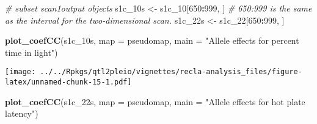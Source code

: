 \documentclass[oneside]{book}
\newenvironment{Shaded}{\begin{snugshade}}{\end{snugshade}}
\newcommand{\CommentTok}[1]{\textcolor[rgb]{0.56,0.35,0.01}{\textit{#1}}}
\newcommand{\DataTypeTok}[1]{\textcolor[rgb]{0.13,0.29,0.53}{#1}}
\newcommand{\DecValTok}[1]{\textcolor[rgb]{0.00,0.00,0.81}{#1}}
\newcommand{\KeywordTok}[1]{\textcolor[rgb]{0.13,0.29,0.53}{\textbf{#1}}}
\newcommand{\NormalTok}[1]{#1}
\newcommand{\OperatorTok}[1]{\textcolor[rgb]{0.81,0.36,0.00}{\textbf{#1}}}
\newcommand{\OtherTok}[1]{\textcolor[rgb]{0.56,0.35,0.01}{#1}}
\newcommand{\StringTok}[1]{\textcolor[rgb]{0.31,0.60,0.02}{#1}}
\begin{document}
\begin{Shaded}
\end{Shaded}

\begin{Shaded}
\begin{Highlighting}[]
\CommentTok{# subset scan1output objects}
\NormalTok{s1c_10s <-}\StringTok{ }\NormalTok{s1c_}\DecValTok{10}\NormalTok{[}\DecValTok{650}\OperatorTok{:}\DecValTok{999}\NormalTok{, ] }\CommentTok{# 650:999 is the same as the interval for the two-dimensional scan.}
\NormalTok{s1c_22s <-}\StringTok{ }\NormalTok{s1c_}\DecValTok{22}\NormalTok{[}\DecValTok{650}\OperatorTok{:}\DecValTok{999}\NormalTok{, ]}
\end{Highlighting}
\end{Shaded}

\begin{Shaded}
\begin{Highlighting}[]
\KeywordTok{plot_coefCC}\NormalTok{(s1c_10s, }\DataTypeTok{map =}\NormalTok{ pseudomap, }\DataTypeTok{main =} \StringTok{"Allele effects for percent time in light"}\NormalTok{)}
\end{Highlighting}
\end{Shaded}

\texttt{[image: ../../Rpkgs/qtl2pleio/vignettes/recla-analysis\_files/figure-latex/unnamed-chunk-15-1.pdf]}

\begin{Shaded}
\begin{Highlighting}[]
\KeywordTok{plot_coefCC}\NormalTok{(s1c_22s, }\DataTypeTok{map =}\NormalTok{ pseudomap, }\DataTypeTok{main =} \StringTok{"Allele effects for hot plate latency"}\NormalTok{)}
\end{Highlighting}
\end{Shaded}
\end{document}
